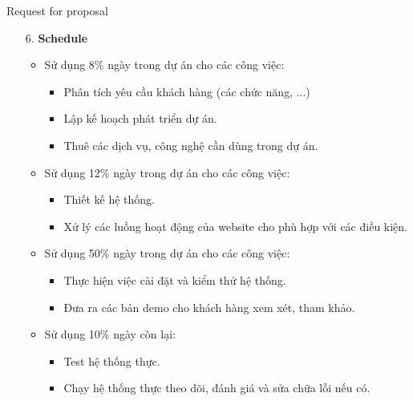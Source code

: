 \documentclass[compress]{beamer}
\begin{document}
\begin{frame}{Request for proposal}
\begin{itemize}
\item[6. ] \textbf{Schedule}
\begin{itemize}
\item Sử dụng 8\% ngày trong dự án cho các công việc:
\begin{itemize}
\item Phân tích yêu cầu khách hàng (các chức năng, ...)
\item Lập kế hoạch phát triển dự án.
\item Thuê các dịch vụ, công nghệ cần dùng trong dự án.
\end{itemize}
\item Sử dụng 12\% ngày trong dự án cho các công việc:
\begin{itemize}
\item Thiết kế hệ thống.
\item Xử lý các luồng hoạt động của website cho phù hợp với các điều kiện.
\end{itemize}
\item Sử dụng 50\% ngày trong dự án cho các công việc:
\begin{itemize}
\item Thực hiện việc cài đặt và kiểm thử hệ thống.
\item Đưa ra các bản demo cho khách hàng xem xét, tham khảo.
\end{itemize}
\item Sử dụng 10\% ngày còn lại:
\begin{itemize}
\item Test hệ thống thực.
\item Chạy hệ thống thực theo dõi, đánh giá và sửa chữa lỗi nếu có.
\end{itemize}
\end{itemize}
\end{itemize}
\end{frame}
\end{document}
